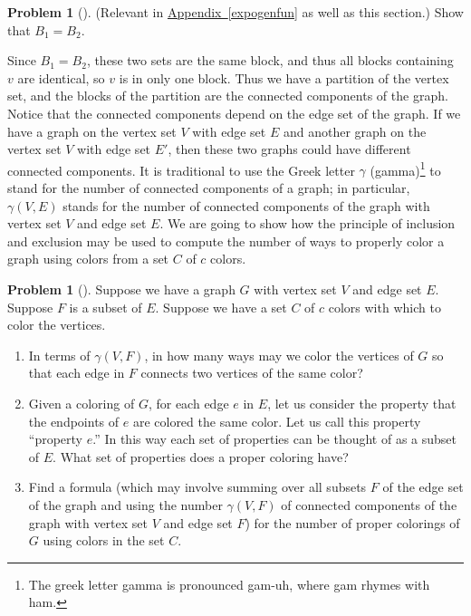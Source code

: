 \documentclass[10pt,]{book}
\theoremstyle{plain}
\theoremstyle{definition}
\newtheorem{activity}[project]{Problem}
\theoremstyle{definition}
\numberwithin{equation}{chapter}
\begin{document}
\begin{activity}[] \label{conncomp}
(Relevant in \hyperref[expogenfun]{Appendix~\ref{expogenfun}} as well as this section.) Show that \(B_1=B_2\).%
\end{activity}
Since \(B_1=B_2\), these two sets are the same block, and thus all blocks containing \(v\) are identical, so \(v\) is in only one block. Thus we have a partition of the vertex set, and the blocks of the partition are the connected components of the graph. Notice that the connected components depend on the edge set of the graph. If we have a graph on the vertex set \(V\) with edge set \(E\) and another graph on the vertex set \(V\) with edge set \(E'\), then these two graphs could have different connected components. It is traditional to use the Greek letter \(\gamma\) (gamma)\footnote{The greek  letter gamma is pronounced gam-uh, where gam rhymes with ham.\label{fn-18}} to stand for the number of connected components of a graph; in particular, \(\gamma(V,E)\) stands for the number of connected components of the graph with vertex set \(V\) and edge set \(E\). We are going to show how the principle of inclusion and exclusion may be used to compute the number of ways to properly color a graph using colors from a set \(C\) of \(c\) colors.%
\begin{activity}[] \label{activity-242}
Suppose we have a graph \(G\) with vertex set \(V\) and edge set \(E\). Suppose \(F\) is a subset of \(E\). Suppose we have a set \(C\) of \(c\) colors with which to color the vertices.%
\begin{enumerate}[font=\bfseries,label=(\alph*),ref=\alph*]
\item\label{task-181} \marginsymbol[-2.5em]{} In terms of \(\gamma(V,F)\), in how many ways may we color the vertices of \(G\) so that each edge in \(F\) connects two vertices of the same color?%
\item\label{task-182} \marginsymbol[-2.5em]{} Given a coloring of \(G\), for each edge \(e\) in \(E\), let us consider the property that the endpoints of \(e\) are colored the same color.  Let us call this property ``property \(e\).''  In this way each set of properties can be thought of as a subset of \(E\).  What set of properties does a proper coloring have?%
\item\label{chromaticpoly} \marginsymbol[-2.5em]{} Find a formula (which may involve summing over all subsets \(F\) of the edge set of the graph and using the number \(\gamma(V,F)\) of connected components of the graph with vertex set \(V\) and edge set \(F\)) for the number of proper colorings of \(G\) using colors in the set \(C\).%
\end{enumerate}
\end{activity}
\end{document}
